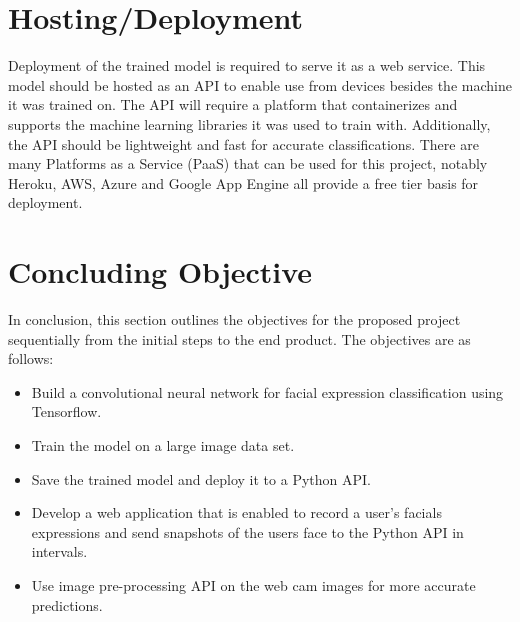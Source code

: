 \section{Hosting/Deployment}
Deployment of the trained model is required to serve it as a web service. This model should be hosted as an API to enable use from devices besides the machine it was trained on. The API will require a platform that containerizes and supports the machine learning libraries it was used to train with. Additionally, the API should be lightweight and fast for accurate classifications. There are many Platforms as a Service (PaaS) that can be used for this project, notably Heroku, AWS, Azure and Google App Engine all provide a free tier basis for deployment.


\section{Concluding Objective}
In conclusion, this section outlines the objectives for the proposed project sequentially from the initial steps to the end product. The objectives are as follows:

\begin{itemize}
	\item Build a convolutional neural network for facial expression classification using Tensorflow.
	\item Train the model on a large image data set.
	\item Save the trained model and deploy it to a Python API.
	\item Develop a web application that is enabled to record a user's facials expressions and send snapshots of the users face to the Python API in intervals.
	\item Use image pre-processing API on the web cam images for more accurate predictions.
\end{itemize}

